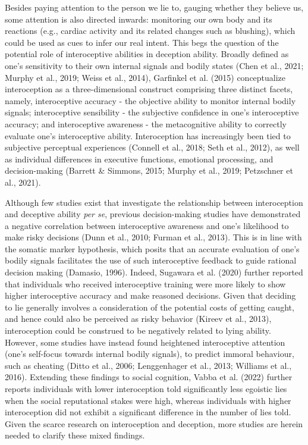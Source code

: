 \documentclass[
  man,mask,floatsintext]{apa6}
\begin{document}
Besides paying attention to the person we lie to, gauging whether they believe us, some attention is also directed inwards: monitoring our own body and its reactions (e.g., cardiac activity and its related changes such as blushing), which could be used as cues to infer our real intent. This begs the question of the potential role of interoceptive abilities in deception ability. Broadly defined as one's sensitivity to their own internal signals and bodily states (Chen et al., 2021; Murphy et al., 2019; Weiss et al., 2014), Garfinkel et al. (2015) conceptualize interoception as a three-dimensional construct comprising three distinct facets, namely, interoceptive accuracy - the objective ability to monitor internal bodily signals; interoceptive sensibility - the subjective confidence in one's interoceptive accuracy; and interoceptive awareness - the metacognitive ability to correctly evaluate one's interoceptive ability. Interoception has increasingly been tied to subjective perceptual experiences (Connell et al., 2018; Seth et al., 2012), as well as individual differences in executive functions, emotional processing, and decision-making (Barrett \& Simmons, 2015; Murphy et al., 2019; Petzschner et al., 2021).

Although few studies exist that investigate the relationship between interoception and deceptive ability \emph{per se}, previous decision-making studies have demonstrated a negative correlation between interoceptive awareness and one's likelihood to make risky decisions (Dunn et al., 2010; Furman et al., 2013). This is in line with the somatic marker hypothesis, which posits that an accurate evaluation of one's bodily signals facilitates the use of such interoceptive feedback to guide rational decision making (Damasio, 1996). Indeed, Sugawara et al. (2020) further reported that individuals who received interoceptive training were more likely to show higher interoceptive accuracy and make reasoned decisions. Given that deciding to lie generally involves a consideration of the potential costs of getting caught, and hence could also be perceived as risky behavior (Kireev et al., 2013), interoception could be construed to be negatively related to lying ability. However, some studies have instead found heightened interoceptive attention (one's self-focus towards internal bodily signals), to predict immoral behaviour, such as cheating (Ditto et al., 2006; Lenggenhager et al., 2013; Williams et al., 2016). Extending these findings to social cognition, Vabba et al. (2022) further reports individuals with lower interoception told significantly less egoistic lies when the social reputational stakes were high, whereas individuals with higher interoception did not exhibit a significant difference in the number of lies told. Given the scarce research on interoception and deception, more studies are herein needed to clarify these mixed findings.
\end{document}
